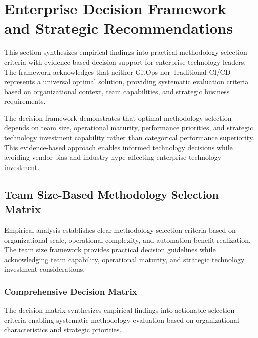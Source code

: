 \section{Enterprise Decision Framework and Strategic Recommendations}
\label{sec:enterprise_framework}

This section synthesizes empirical findings into practical methodology selection criteria with evidence-based decision support for enterprise technology leaders. The framework acknowledges that neither GitOps nor Traditional CI/CD represents a universal optimal solution, providing systematic evaluation criteria based on organizational context, team capabilities, and strategic business requirements.

The decision framework demonstrates that optimal methodology selection depends on team size, operational maturity, performance priorities, and strategic technology investment capability rather than categorical performance superiority. This evidence-based approach enables informed technology decisions while avoiding vendor bias and industry hype affecting enterprise technology investment.

\subsection{Team Size-Based Methodology Selection Matrix}
\label{subsec:team_size_matrix}

Empirical analysis establishes clear methodology selection criteria based on organizational scale, operational complexity, and automation benefit realization. The team size framework provides practical decision guidelines while acknowledging team capability, operational maturity, and strategic technology investment considerations.

\subsubsection{Comprehensive Decision Matrix}

The decision matrix synthesizes empirical findings into actionable selection criteria enabling systematic methodology evaluation based on organizational characteristics and strategic priorities.

